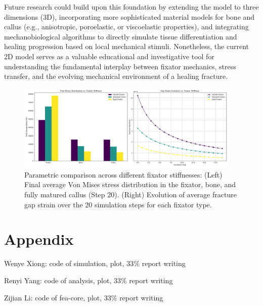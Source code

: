 \documentclass{article}
\begin{document}
Future research could build upon this foundation by extending the model to three dimensions (3D), incorporating more sophisticated material models for bone and callus (e.g., anisotropic, poroelastic, or viscoelastic properties), and integrating mechanobiological algorithms to directly simulate tissue differentiation and healing progression based on local mechanical stimuli. Nonetheless, the current 2D model serves as a valuable educational and investigative tool for understanding the fundamental interplay between fixator mechanics, stress transfer, and the evolving mechanical environment of a healing fracture.

\begin{figure}[H]
  \centering
  \includegraphics[width=0.95\textwidth]{../output_advanced/parametric_comparison.png}
  \caption{Parametric comparison across different fixator stiffnesses: (Left) Final average Von Mises stress distribution in the fixator, bone, and fully matured callus (Step 20). (Right) Evolution of average fracture gap strain over the 20 simulation steps for each fixator type.}
  \label{fig:parametric_comparison}
\end{figure}

\section{Appendix}

Wenye Xiong: code of simulation, plot, 33$\%$ report writing

Renyi Yang: code of analysis, plot, 33$\%$ report writing

Zijian Li: code of fea-core, plot, 33$\%$ report writing



\end{document}
